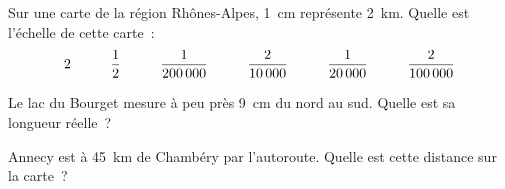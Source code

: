 \par
\begin{myenumerate}
\item Sur une carte de la région Rhônes-Alpes, 1~cm représente 2~km. Quelle est l'échelle de cette carte : 
\[2\kern1cm\dfrac12\kern1cm\dfrac1{200\,000}\kern1cm\dfrac2{10\,000}\kern1cm\dfrac1{20\,000}\kern1cm\dfrac2{100\,000}\]
\item Le lac du Bourget mesure à peu près 9~cm du nord au sud. Quelle est sa longueur réelle ?
\item Annecy est à 45~km de Chambéry par l'autoroute. Quelle est cette distance sur la carte ?
\end{myenumerate}